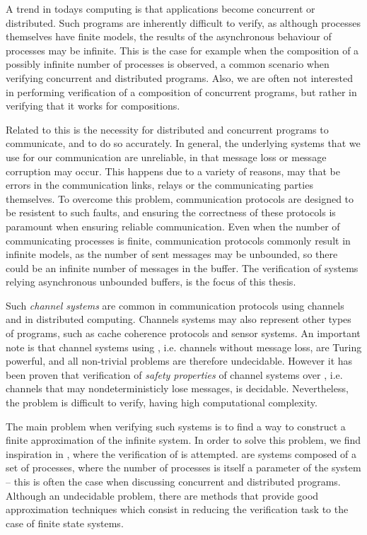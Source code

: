 A trend in todays computing is that applications become concurrent or distributed. Such programs are inherently difficult to verify, as although processes themselves have finite models, the results of the asynchronous behaviour of processes may be infinite. This is the case for example when the composition of a possibly infinite number of processes is observed, a common scenario when verifying  concurrent and distributed programs. Also, we are often not interested in performing verification of a  composition of concurrent programs, but rather in verifying that it works for  compositions.

Related to this is the necessity for distributed and concurrent programs to communicate, and to do so accurately. In general, the underlying systems that we use for our communication are unreliable, in that message loss or message corruption may occur. This happens due to a variety of reasons, may that be errors in the communication links, relays or the communicating parties themselves. To overcome this problem, communication protocols are designed to be resistent to such faults, and ensuring the correctness of these protocols is paramount when ensuring reliable communication. Even when the number of communicating processes is finite, communication protocols commonly result in infinite models, as the number of sent messages may be unbounded, so there could be an infinite number of messages in the buffer. The verification of systems relying asynchronous unbounded buffers, is the focus of this thesis.

Such \emph{channel systems} are common in communication protocols using channels and in distributed computing\cite{fredlund2007mcerlang}. Channels systems may also represent other types of programs, such as cache coherence protocols and sensor systems\cite{zuck2004}. An important note is that channel systems using , i.e. channels without message loss, are Turing powerful, and all non-trivial problems are therefore undecidable. However it has been proven that verification of \emph{safety properties} of channel systems over , i.e. channels that may nondeterministicly lose messages, is decidable\cite{287591}\cite{gordon}. Nevertheless, the problem is difficult to verify, having high computational complexity.

The main problem when verifying such systems is to find a way to construct a finite approximation of the infinite system. In order to solve this problem, we find inspiration in \cite{parosh}, where the verification of  is attempted.  are systems composed of a set of processes, where the number of processes is itself a parameter of the system -- this is often the case when discussing concurrent and distributed programs. Although an undecidable problem, there are methods that provide good approximation techniques which consist in reducing the verification task to the case of finite state systems.

